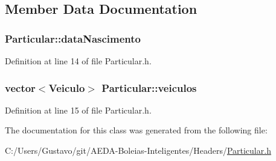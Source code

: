 \subsection{Member Data Documentation}
\hypertarget{class_particular_ac1e89ce3d018c9d22249bdd0393988a8}{
\subsubsection[{data\+Nascimento}]{ Particular\+::data\+Nascimento\hspace{0.3cm}{\ttfamily [private]}}}\label{class_particular_ac1e89ce3d018c9d22249bdd0393988a8}


Definition at line 14 of file Particular.\+h.

\hypertarget{class_particular_a59ecc721e0a2f083d5bc1b4fab84f31c}{
\subsubsection[{veiculos}]{\setlength{\rightskip}{0pt plus 5cm}vector$<${\bf Veiculo}$>$ Particular\+::veiculos\hspace{0.3cm}{\ttfamily [private]}}}\label{class_particular_a59ecc721e0a2f083d5bc1b4fab84f31c}


Definition at line 15 of file Particular.\+h.



The documentation for this class was generated from the following file\+:\begin{DoxyCompactItemize}
\item 
C\+:/\+Users/\+Gustavo/git/\+A\+E\+D\+A-\/\+Boleias-\/\+Inteligentes/\+Headers/\hyperlink{_particular_8h}{Particular.\+h}\end{DoxyCompactItemize}
